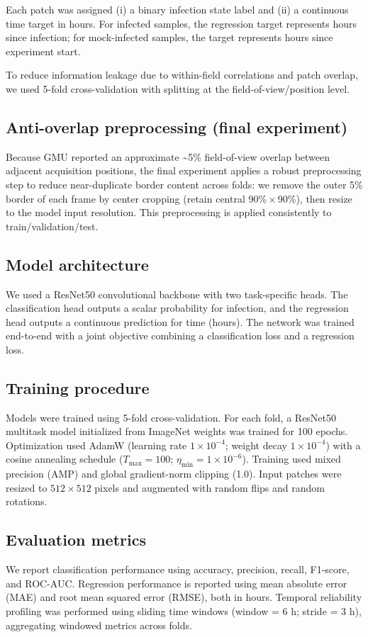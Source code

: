 \documentclass[journal,cells,article,submit,pdftex,moreauthors]{Definitions/mdpi}
\begin{document}
Each patch was assigned (i) a binary infection state label and (ii) a continuous time target in hours. For infected samples, the regression target represents hours since infection; for mock-infected samples, the target represents hours since experiment start.

To reduce information leakage due to within-field correlations and patch overlap, we used 5-fold cross-validation with splitting at the field-of-view/position level.

\subsection{Anti-overlap preprocessing (final experiment)}
Because GMU reported an approximate \textasciitilde5\% field-of-view overlap between adjacent acquisition positions, the final experiment applies a robust preprocessing step to reduce near-duplicate border content across folds: we remove the outer 5\% border of each frame by center cropping (retain central 90\%\,$\times$\,90\%), then resize to the model input resolution. This preprocessing is applied consistently to train/validation/test.

\subsection{Model architecture}
We used a ResNet50 convolutional backbone with two task-specific heads. The classification head outputs a scalar probability for infection, and the regression head outputs a continuous prediction for time (hours). The network was trained end-to-end with a joint objective combining a classification loss and a regression loss.

\subsection{Training procedure}
Models were trained using 5-fold cross-validation. For each fold, a ResNet50 multitask model initialized from ImageNet weights was trained for 100 epochs. Optimization used AdamW (learning rate $1\times10^{-4}$; weight decay $1\times10^{-4}$) with a cosine annealing schedule ($T_{\max}=100$; $\eta_{\min}=1\times10^{-6}$). Training used mixed precision (AMP) and global gradient-norm clipping (1.0). Input patches were resized to $512\times512$ pixels and augmented with random flips and random rotations.

\subsection{Evaluation metrics}
We report classification performance using accuracy, precision, recall, F1-score, and ROC-AUC. Regression performance is reported using mean absolute error (MAE) and root mean squared error (RMSE), both in hours. Temporal reliability profiling was performed using sliding time windows (window = 6 h; stride = 3 h), aggregating windowed metrics across folds.
\end{document}
